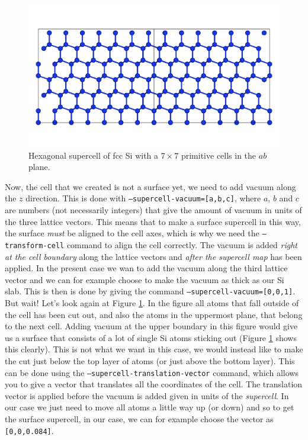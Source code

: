 \documentclass[11pt]{article}
\begin{document}
\begin{figure}[htbp] %
   \centering
   \includegraphics[width=\textwidth]{Si_large.png} 
   \caption{Hexagonal supercell of fcc Si with a $7\times7$ primitive cells in the $ab$ plane.}
   \label{largeSi}
\end{figure}

Now, the cell that we created is not a surface yet, we need to add vacuum along the $z$ direction. This is done with \texttt{--supercell-vacuum=[a,b,c]}, where $a$, $b$ and $c$ are numbers (not necessarily integers) that give the amount of vacuum in units of the three lattice vectors. This means that to make a surface supercell in this way, the surface \emph{must} be aligned to the cell axes, which is why we need the \texttt{--transform-cell} command to align the cell correctly. The vacuum is added \emph{right at the cell boundary} along the lattice vectors and \emph{after the supercell map} has been applied. In the present case we wan to add the vacuum along the third lattice vector and we can for example choose to make the vacuum as thick as our Si slab. This is then is done by giving the command \texttt{--supercell-vacuum=[0,0,1]}. But wait! Let's look again at Figure \ref{largeSi}. In the figure all atoms that fall outside of the cell has been cut out, and also the atoms in the uppermost plane, that belong to the next cell. Adding vacuum at the upper boundary in this figure would give us a surface that consists of a lot of single Si atoms sticking out (Figure \ref{largeSi} shows this clearly). This is not what we want in this case, we would instead like to make the cut just below the top layer of atoms (or just above the bottom layer). This can be done using the \texttt{--supercell-translation-vector} command, which allows you to give a vector that translates all the coordinates of the cell. The translation vector is applied before the vacuum is added given in units of the \emph{supercell}. In our case we just need to move all atoms a little way up (or down) and so to get the surface supercell, in our case, we can for example choose the vector as \texttt{[0,0,0.084]}. 
\end{document}
